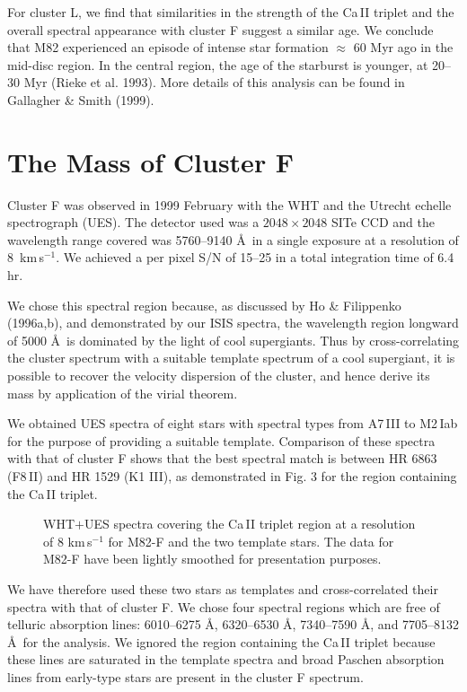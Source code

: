For cluster L, we find that similarities in the strength of the Ca\,II
triplet and the overall spectral appearance with cluster F suggest a
similar age. We conclude that M82 experienced an episode of intense
star formation $\approx$ 60 Myr ago in the mid-disc region. In the
central region, the age of the starburst is younger, at 20--30 Myr
(Rieke et al.  1993).  More details of this analysis can be found in
Gallagher \& Smith (1999).

\section{The Mass of Cluster F}
Cluster F was observed in 1999 February with the WHT and the Utrecht
echelle spectrograph (UES). The detector used was a $2048 \times 2048$ SITe
CCD and the wavelength range covered was 5760--9140 \AA\ in a single
exposure at a resolution of 8~km\,s$^{-1}$. We achieved a 
per pixel S/N of 15--25 in a total integration time of 6.4 hr.

We chose this spectral region because, as discussed by Ho \&
Filippenko (1996a,b), and demonstrated by our ISIS spectra, the
wavelength region longward of 5000 \AA\ is dominated by the light of
cool supergiants.  Thus by cross-correlating the cluster spectrum with
a suitable template spectrum of a cool supergiant, it is possible to
recover the velocity dispersion of the cluster, and hence derive its
mass by application of the virial theorem.

We obtained UES spectra of eight stars with spectral types from
A7\,III to M2\,Iab for the purpose of providing a suitable template.
Comparison of these spectra with that of cluster F shows that the
best spectral match is between HR 6863 (F8\,II) and HR 1529 (K1 III), as
demonstrated in Fig. 3 for the region containing the Ca\,II triplet.

\begin{figure}
\caption{WHT$+$UES spectra covering the Ca\,II triplet region at a resolution
of 8 km\,s$^{-1}$ for M82-F and the two template stars.
The data for M82-F have been lightly smoothed for
presentation purposes.}
\label{ues}
\end{figure}
We have therefore used these two stars as templates and
cross-correlated their spectra with that of cluster F. We chose four
spectral regions which are free of telluric absorption lines:
6010--6275 \AA, 6320--6530 \AA, 7340--7590 \AA, and 7705--8132 \AA\
for the analysis.  We ignored the region containing the Ca\,II
triplet because these lines are saturated in the template spectra and
broad Paschen absorption lines from early-type stars are present in
the cluster F spectrum.

